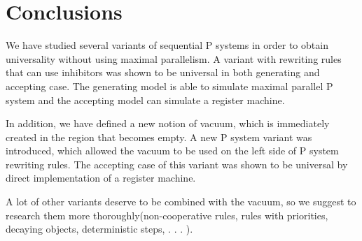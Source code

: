 \chapter*{Conclusions}
We have studied several variants of sequential P systems in order to obtain universality without using maximal parallelism. A variant with rewriting rules that can use inhibitors was shown to be universal in both generating and accepting case. The generating model is able to simulate maximal parallel P system and the accepting model can simulate a register machine.

In addition, we have defined a new notion of vacuum, which is immediately created in the region that becomes empty. A new P system variant was introduced, which allowed the vacuum to be used on the left side of P system rewriting rules. The accepting case of this variant was shown to be universal by direct implementation of a register machine.

A lot of other variants deserve to be combined with the vacuum, so we suggest to research them more
thoroughly(non-cooperative rules, rules with priorities, decaying objects, deterministic steps, . . . ).